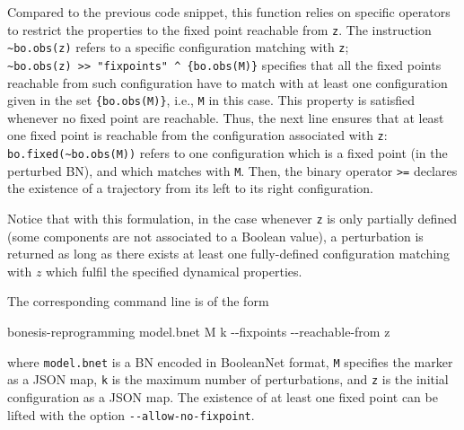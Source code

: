 \documentclass[PCJ,Unicode,screen,mode=plain]{cedram}
\newenvironment{Shaded}{}{}
\newcommand{\NormalTok}[1]{{#1}}
\newcommand{\ExtensionTok}[1]{{#1}}
\newcommand{\AttributeTok}[1]{\textcolor[rgb]{0.49,0.56,0.16}{{#1}}}
\begin{document}
Compared to the previous code snippet, this function relies on specific
operators to restrict the properties to the fixed point reachable from
\texttt{z}. The instruction \texttt{\textasciitilde{}bo.obs(z)} refers
to a specific configuration matching with \texttt{z};
\texttt{\textasciitilde{}bo.obs(z)\ \textgreater{}\textgreater{}\ "fixpoints"\ \^{}\ \{bo.obs(M)\}}
specifies that all the fixed points reachable from such configuration
have to match with at least one configuration given in the set
\texttt{\{bo.obs(M)\}}, i.e., \texttt{M} in this case. This property is
satisfied whenever no fixed point are reachable. Thus, the next line
ensures that at least one fixed point is reachable from the
configuration associated with \texttt{z}:
\texttt{bo.fixed(\textasciitilde{}bo.obs(M))} refers to one
configuration which is a fixed point (in the perturbed BN), and which
matches with \texttt{M}. Then, the binary operator
\texttt{\textgreater{}=} declares the existence of a trajectory from its
left to its right configuration.

Notice that with this formulation, in the case whenever \texttt{z} is
only partially defined (some components are not associated to a Boolean
value), a perturbation is returned as long as there exists at least one
fully-defined configuration matching with \(z\) which fulfil the
specified dynamical properties.

The corresponding command line is of the form

\begin{Shaded}
\begin{Highlighting}[]
\ExtensionTok{bonesis{-}reprogramming}\NormalTok{ model.bnet M k }\AttributeTok{{-}{-}fixpoints} \AttributeTok{{-}{-}reachable{-}from}\NormalTok{ z}
\end{Highlighting}
\end{Shaded}

where \texttt{model.bnet} is a BN encoded in BooleanNet format,
\texttt{M} specifies the marker as a JSON map, \texttt{k} is the maximum
number of perturbations, and \texttt{z} is the initial configuration as
a JSON map. The existence of at least one fixed point can be lifted with
the option \texttt{-\/-allow-no-fixpoint}.
\end{document}
